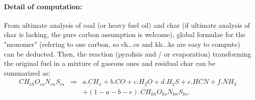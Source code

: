 \paragraph{Detail of computation:} 
From ultimate analysis of coal (or heavy fuel oil) and char (if ultimate
analysis of char is lacking, the pure carbon assumption is welcome), global
formulae for the "monomer" (refering to one carbon, so ch...cs and kh...ks are
easy to compute) can be deducted. Then, the reaction (pyrolisis and / or
evaporation) transforming the original fuel in a mixture of gaseous ones and
residual char can be summarized as:
\begin{eqnarray*}
CH_{ch}O_{co}N_{cn}S_{cs} & \Rightarrow & a . CH_{x} + b . CO + c . H_{2}O + d . H_{2}S + e . HCN + f . NH_{3} \\
                          &             & + (1-a-b-e) . CH_{kh}O_{ko}N_{kn}S_{ks}.
\end{eqnarray*} 

